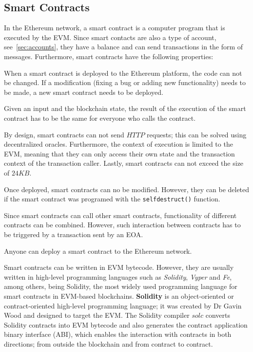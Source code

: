 \documentclass[11pt,a4paper]{report}
\begin{document}
\subsection{Smart Contracts}\label{sec:sc}
In the Ethereum network, a smart contract\cite{book:masteringETH-sc-solidity}\cite{smartcontracts} is a computer program that is executed by the EVM. Since smart contacts are also a type of account, see~\ref{sec:accounts}, they have a balance and can send transactions in the form of messages. Furthermore, smart contracts have the following properties:
\begin{description}[style=nextline] %
	\item[{\textbf{Immutability}}] When a smart contract is deployed to the Ethereum platform, the code can not be changed. If a modification (fixing a bug or adding new functionality) needs to be made, a new smart contract needs to be deployed.
	\item[{\textbf{Determinism}}] Given an input and the blockchain state, the result of the execution of the smart contract has to be the same for everyone who calls the contract.
	\item[{\textbf{Limitations}}] By design, smart contracts can not send $HTTP$ requests; this can be solved using decentralized oracles\cite{oracles}. Furthermore, the context of execution is limited to the EVM, meaning that they can only access their own state and the transaction context of the transaction caller. Lastly, smart contracts can not exceed the size of $24KB$.
	\item[{\textbf{Lifecycle}}] Once deployed, smart contracts can no be modified. However, they can be deleted if the smart contract was programed with the \verb|selfdestruct()| function.
	\item[{\textbf{Composability}}] Since smart contracts can call other smart contracts, functionality of different contracts can be combined. However, such interaction between contracts has to be triggered by a transaction sent by an EOA.
	\item[{\textbf{Permissionless}}] Anyone can deploy a smart contract to the Ethereum network.    
\end{description}
Smart contracts can be written in EVM bytecode\cite{evmbytecode}. However, they are usually written in high-level programming languages such as \textit{Solidity}, \textit{Vyper}\cite{vyper} and \textit{Fe}\cite{fe}, among others, being Solidity, the most widely used programming language for smart contracts in EVM-based blockchains. \textbf{Solidity}\cite{book:masteringETH-sc-solidity}\cite{solidity} is an object-oriented or contract-oriented high-level programming language; it was created by Dr Gavin Wood and designed to target the EVM.  The Solidity compiler $solc$ converts Solidity contracts into EVM bytecode and also generates the contract application binary interface (ABI)\cite{abi}, which enables the interaction with contracts in both directions; from outside the blockchain and from contract to contract.
 
\end{document}

